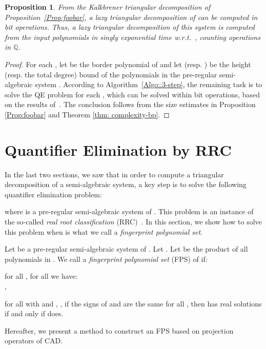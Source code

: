 \documentclass{sig-alternate}
\def\Q {\ensuremath{\mathbb{Q}}}
\newtheorem{Proposition}{Proposition}
\def\Q {\ensuremath{\mathbb{Q}}}
\begin{document}
\begin{Proposition}
		\label{prop:lazy-rtd}
From the Kalkbrener triangular decomposition  of  
Proposition~\ref{Prop:foobar}, 
a lazy triangular decomposition of 
can be computed
in   bit operations.
Thus, a lazy triangular decomposition of this system 
is computed from the input polynomials in singly exponential time
w.r.t.\ , counting operations in {\Q}.
\end{Proposition}
\begin{proof}
For each , 
let  be the border polynomial of  and
let  (resp. ) be the height 
(resp. the total degree) bound
of the polynomials in the pre-regular 
semi-algebraic system .
According to Algorithm~\ref{Algo::3-step}, the remaining task is to solve 
the {\small QE} problem  for
each , 
which can be solved within 
 bit operations,
based on the results of~\cite{Ren92}.
The conclusion 
 follows from the size estimates in Proposition \ref{Prop:foobar} and
Theorem \ref{thm: complexity-bp}. 
\end{proof}


\section{Quantifier Elimination by RRC}
\label{sec:FPS}

In the last two sections, we saw that in order 
to compute a triangular decomposition of 
a semi-algebraic system, 
a key step is to solve the following quantifier 
elimination problem: 

where  is a pre-regular semi-algebraic 
system of . 
This problem is an instance of the so-called
{\em real root classification} ({\small RRC})~\cite{YX05}.
In this section, we show how to solve this problem
when  is what we call a {\em fingerprint polynomial set}.

\smallskip{}
Let  be a pre-regular semi-algebraic system of .
Let .
Let  be
the product of all polynomials in .
We call    a {\em fingerprint polynomial set} ({\small FPS}) of  if:
\begin{itemizeshort}
\item[] for all , for all  we have:\\
  ,
\item[] for all  with 
and , , 
if the signs of   and  are 
the same for all , then 
 has real solutions if and only if  does.
\end{itemizeshort}

Hereafter,
we present a method to construct an {\small FPS}
based on projection operators of {\small CAD}.
\end{document}
